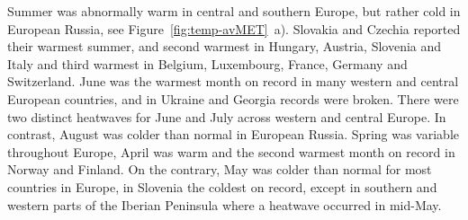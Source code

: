 Summer was abnormally warm in central and southern Europe, but rather cold in European Russia, see Figure~\ref{fig:temp-avMET}~a). Slovakia and Czechia reported their warmest summer, and second warmest in Hungary, Austria, Slovenia and Italy and third warmest in Belgium, Luxembourg, France, Germany and Switzerland. June was the warmest month on record in many western and central European countries, and in Ukraine and Georgia records were broken. There were two distinct heatwaves for June and July across western and central Europe. In contrast, August was colder than normal in European Russia. Spring was variable throughout Europe, April was warm and the second warmest month on record in Norway and Finland. On the contrary, May was colder than normal for most countries in Europe, in Slovenia the coldest on record, except in southern and western parts of the Iberian Peninsula where a heatwave occurred in mid-May.

